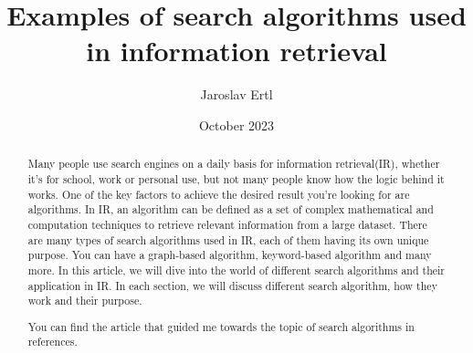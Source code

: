 \documentclass{article}
\title{\textbf{Examples of search algorithms used in information retrieval}}
\author{Jaroslav Ertl}
\date{October 2023}
\begin{document}
\maketitle
 
\begin{abstract}
    Many people use search engines on a daily basis for information retrieval(IR), whether it's for school, work or personal use, but not many people know how the logic behind it works. One of the key factors to achieve the desired result you're looking for are algorithms. In IR, an algorithm can be defined as a set of complex mathematical and computation techniques to retrieve relevant information from a large dataset. There are many types of search algorithms used in IR, each of them having its own unique purpose. You can have a graph-based algorithm, keyword-based algorithm and many more. In this article, we will dive into the world of different search algorithms and their application in IR. In each section, we will discuss different search algorithm, how they work and their purpose.


You can find the article that guided me towards the topic of search algorithms in references.\cite{10210566}
\end{abstract}


 
\cite{Chonyy}
\end{document}
